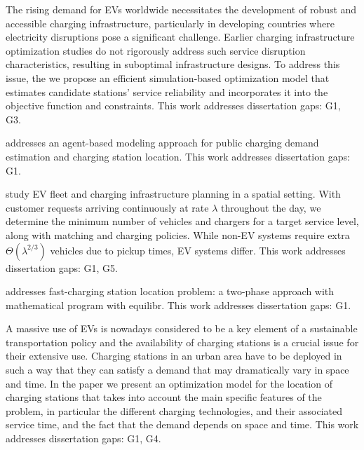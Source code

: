 \documentclass[letterpaper, 12pt, oneside, doublespacing]{Thesis}
\begin{document}
\noindent The rising demand for EVs worldwide necessitates the development of robust and accessible charging infrastructure, particularly in developing countries where electricity disruptions pose a significant challenge. Earlier charging infrastructure optimization studies do not rigorously address such service disruption characteristics, resulting in suboptimal infrastructure designs. To address this issue, the we \cite{a_robust_2023} propose an efficient simulation-based optimization model that estimates candidate stations' service reliability and incorporates it into the objective function and constraints. This work addresses dissertation gaps: G1, G3.



\noindent \cite{an_agent-based_2023} addresses an agent-based modeling approach for public charging demand estimation and charging station location. This work addresses dissertation gaps: G1.



\noindent \cite{electric_vehicle_2023} study EV fleet and charging infrastructure planning in a spatial setting. With customer requests arriving continuously at rate $\lambda$ throughout the day, we determine the minimum number of vehicles and chargers for a target service level, along with matching and charging policies. While non-EV systems require extra $\Theta(\lambda^{2/3})$ vehicles due to pickup times, EV systems differ. This work addresses dissertation gaps: G1, G5.



\noindent \cite{fast-charging_station_2023} addresses fast-charging station location problem: a two-phase approach with mathematical program with equilibr. This work addresses dissertation gaps: G1.



\noindent A massive use of EVs is nowadays considered to be a key element of a sustainable transportation policy and the availability of charging stations is a crucial issue for their extensive use. Charging stations in an urban area have to be deployed in such a way that they can satisfy a demand that may dramatically vary in space and time. In the paper \cite{incorporating_time-dependent_2023} we present an optimization model for the location of charging stations that takes into account the main specific features of the problem, in particular the different charging technologies, and their associated service time, and the fact that the demand depends on space and time. This work addresses dissertation gaps: G1, G4.
\end{document}
